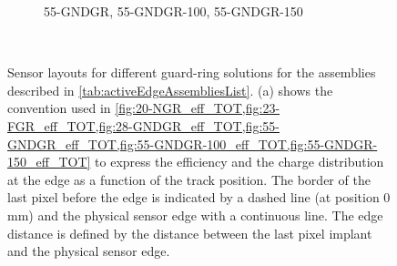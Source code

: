 \begin{figure}[htbp]
\begin{subfigure}[t]{0.5\textwidth}
\begin{tikzpicture}
    \end{tikzpicture}
    \caption{55-GNDGR, 55-GNDGR-100, 55-GNDGR-150}
    \label{fig:Layout50_GNDGR}
  \end{subfigure}~
  \caption{Sensor layouts for different guard-ring solutions for the
    assemblies described in \cref{tab:activeEdgeAssembliesList}. (a)
    shows the convention used in \cref{fig:20-NGR_eff_TOT,fig:23-FGR_eff_TOT,fig:28-GNDGR_eff_TOT,fig:55-GNDGR_eff_TOT,fig:55-GNDGR-100_eff_TOT,fig:55-GNDGR-150_eff_TOT}
    to express the efficiency and the charge distribution at the edge
    as a function of the track position. The border of the last pixel
    before the edge is indicated by a dashed line (at position 0 mm)
    and the physical sensor edge with a continuous line. The edge
    distance is defined by the distance between the last pixel implant
    and the physical sensor edge.}
  \label{fig:Layout_guard_ring}
\end{figure}




